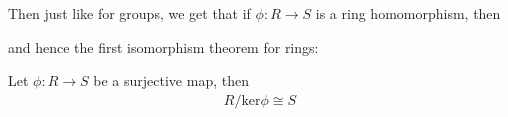 \documentclass[12pt, twosided]{article}
\begin{document}
Then just like for groups, we get that if \(\phi: R \to S\) is a ring homomorphism, then

\begin{center}
\end{center}
and hence the first isomorphism theorem for rings:

\begin{thm}
  Let \(\phi: R \to S\) be a surjective map, then
  \begin{align*}
    R / \mathrm{ker} \phi \cong S
  \end{align*}
\end{thm}
\end{document}
